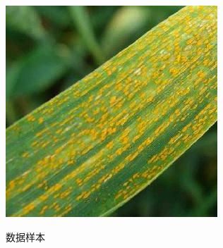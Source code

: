 \begin{figure}[htbp]
{\begin{minipage}[t]{.2\textwidth}
          \includegraphics[width=\textwidth, natwidth=300, natheight=300]{resource/3.3锈病(3).jpg} \
        \end{minipage}
      }
      \caption{数据样本}
      \label{Figure.Third.5}
    \end{figure}


